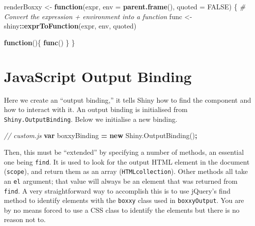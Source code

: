 \documentclass[
]{krantz}
\makeatletter
\newenvironment{Shaded}{\begin{snugshade}}{\end{snugshade}}
\newcommand{\AttributeTok}[1]{\textcolor[rgb]{0.61,0.61,0.61}{#1}}
\newcommand{\CommentTok}[1]{\textcolor[rgb]{0.37,0.37,0.37}{\textit{#1}}}
\newcommand{\ControlFlowTok}[1]{\textcolor[rgb]{0.27,0.27,0.27}{\textbf{#1}}}
\newcommand{\DataTypeTok}[1]{\textcolor[rgb]{0.27,0.27,0.27}{#1}}
\newcommand{\KeywordTok}[1]{\textcolor[rgb]{0.27,0.27,0.27}{\textbf{#1}}}
\newcommand{\NormalTok}[1]{#1}
\newcommand{\OperatorTok}[1]{\textcolor[rgb]{0.43,0.43,0.43}{\textbf{#1}}}
\newcommand{\OtherTok}[1]{\textcolor[rgb]{0.37,0.37,0.37}{#1}}
\newcommand{\StringTok}[1]{\textcolor[rgb]{0.5,0.5,0.5}{#1}}
\newcommand{\VariableTok}[1]{\textcolor[rgb]{0,0,0}{#1}}
\newenvironment{kframe}{%
\medskip{}
\setlength{\fboxsep}{.8em}
 \def\at@end@of@kframe{}%
 \ifinner\ifhmode%
  \def\at@end@of@kframe{\end{minipage}}%
  \begin{minipage}{\columnwidth}%
 \fi\fi%
 \def\FrameCommand##1{\hskip\@totalleftmargin \hskip-\fboxsep
 \colorbox{shadecolor}{##1}\hskip-\fboxsep
     \hskip-\linewidth \hskip-\@totalleftmargin \hskip\columnwidth}%
 \MakeFramed {\advance\hsize-\width
   \@totalleftmargin\z@ \linewidth\hsize
   \@setminipage}}%
 {\par\unskip\endMakeFramed%
 \at@end@of@kframe}
\renewenvironment{Shaded}{\begin{kframe}}{\end{kframe}}
\makeatother
\begin{document}
\begin{Shaded}
\begin{Highlighting}[]
\NormalTok{renderBoxxy <{-}}\StringTok{ }\ControlFlowTok{function}\NormalTok{(expr, }\DataTypeTok{env =} \KeywordTok{parent.frame}\NormalTok{(), }
  \DataTypeTok{quoted =} \OtherTok{FALSE}\NormalTok{) \{}
  \CommentTok{\# Convert the expression + environment into a function}
\NormalTok{  func <{-}}\StringTok{ }\NormalTok{shiny}\OperatorTok{::}\KeywordTok{exprToFunction}\NormalTok{(expr, env, quoted)}

  \ControlFlowTok{function}\NormalTok{()\{}
    \KeywordTok{func}\NormalTok{()}
\NormalTok{  \}}
\NormalTok{\}}
\end{Highlighting}
\end{Shaded}

\hypertarget{shiny-output-binding}{%
\section{JavaScript Output Binding}\label{shiny-output-binding}}

Here we create an ``output binding,'' it tells Shiny how to find the component and how to interact with it. An output binding is initialised from \texttt{Shiny.OutputBinding}. Below we initialise a new binding.

\begin{Shaded}
\begin{Highlighting}[]
\CommentTok{// custom.js}
\KeywordTok{var}\NormalTok{ boxxyBinding }\OperatorTok{=} \KeywordTok{new} \VariableTok{Shiny}\NormalTok{.}\AttributeTok{OutputBinding}\NormalTok{()}\OperatorTok{;}
\end{Highlighting}
\end{Shaded}

Then, this must be ``extended'' by specifying a number of methods, an essential one being \texttt{find}. It is used to look for the output HTML element in the document (\texttt{scope}), and return them as an array (\texttt{HTMLcollection}). Other methods all take an \texttt{el} argument; that value will always be an element that was returned from \texttt{find}. A very straightforward way to accomplish this is to use jQuery's find method to identify elements with the \texttt{boxxy} class used in \texttt{boxxyOutput}. You are by no means forced to use a CSS class to identify the elements but there is no reason not to.
\end{document}
